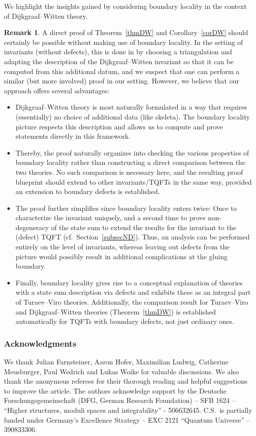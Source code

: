 \documentclass[pdftex]{sigma}
\numberwithin{equation}{section}
\theoremstyle{definition}
\newtheorem{Remark}[Remark]{Remark}
\begin{document}
We highlight the insights gained by considering boundary locality in the context of Dijkgraaf--Witten theory.
\begin{Remark}
A direct proof of Theorem~\ref{thmDW} and Corollary~\ref{corDW} should certainly be possible without making use of boundary locality. In the setting of invariants (without defects), this is done in \cite[Theorem~H.1]{TV} by choosing a triangulation and adapting the description of the Dijkgraaf--Witten invariant so that it can be computed from this additional datum, and we suspect that one can perform a similar (but more involved) proof in our setting. However, we believe that our approach offers several advantages:
\begin{itemize}\itemsep=0pt
 \item Dijkgraaf--Witten theory is most naturally formulated in a way that requires (essentially) no choice of additional data (like skeleta). The boundary locality picture respects this description and allows us to compute and prove statements directly in this framework.
 \item Thereby, the proof naturally organizes into checking the various properties of boundary locality rather than constructing a direct comparison between the two theories. No such comparison is necessary here, and the resulting proof blueprint should extend to other invariants/TQFTs in the same way, provided an extension to boundary defects is established.
 \item The proof further simplifies since boundary locality enters twice: Once to characterize the invariant uniquely, and a second time to prove non-degeneracy of the state sum to extend the results for the invariant to the (defect) TQFT (cf.~Section~\ref{subsecND}). Thus, an analysis can be performed entirely on the level of invariants, whereas leaving out defects from the picture would possibly result in additional complications at the gluing boundary.
 \item Finally, boundary locality gives rise to a conceptual explanation of theories with a state sum description via defects and exhibits these as an integral part of Turaev--Viro theories.
 Additionally, the comparison result for Turaev--Viro and Dijkgraaf--Witten theories (Theorem~\ref{thmDW}) is established automatically for TQFTs with boundary defects, not just ordinary ones.
\end{itemize}
\end{Remark}

\subsubsection*{Acknowledgments}
We thank Julian Farnsteiner, Aaron Hofer, Maximilian Ludwig, Catherine Meusburger, Paul Wedrich and Lukas Woike for
valuable discussions. We also thank the anonymous referees for their thorough reading and helpful suggestions to improve the article. The authors acknowledge support by the Deutsche Forschungsgemeinschaft (DFG, German Research Foundation) – SFB 1624 – ``Higher structures, moduli spaces and integrability'' - 506632645. C.S.\ is partially funded under Germany's Excellence
Strategy – EXC 2121 ``Quantum Universe'' – 390833306.
\end{document}
